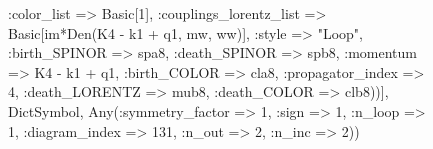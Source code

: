 \documentclass{revtex4}
\begin{document}
\begin{figure}[!htb]
\begin{center}
{:color_list => Basic[1], :couplings_lorentz_list => Basic[im*Den(K4 - k1 + q1, mw, ww)], :style => "Loop", :birth_SPINOR => spa8, :death_SPINOR => spb8, :momentum => K4 - k1 + q1, :birth_COLOR => cla8, :propagator_index => 4, :death_LORENTZ => mub8, :death_COLOR => clb8))], Dict{Symbol, Any}(:symmetry_factor => 1, :sign => 1, :n_loop => 1, :diagram_index => 131, :n_out => 2, :n_inc => 2)) 
}
\end{center}
\end{figure}
\end{document}
